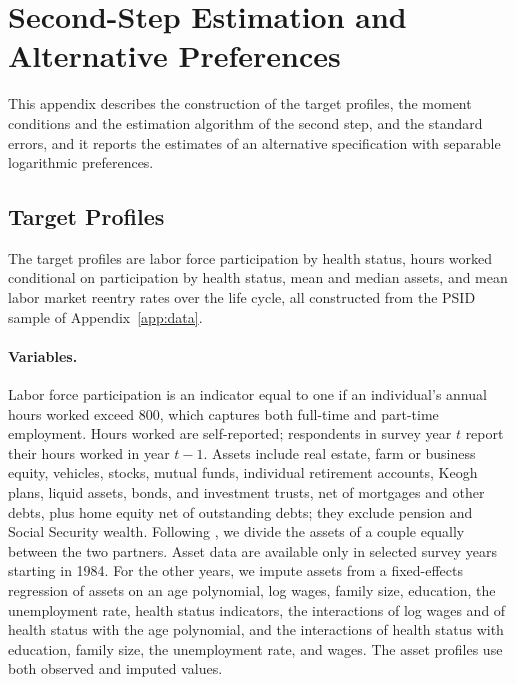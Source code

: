 \section{Second-Step Estimation and Alternative Preferences}\label{app:msm}

This appendix describes the construction of the target profiles, the moment conditions and the estimation algorithm of the second step, and the standard errors, and it reports the estimates of an alternative specification with separable logarithmic preferences.

\subsection{Target Profiles}

The target profiles are labor force participation by health status, hours worked conditional on participation by health status, mean and median assets, and mean labor market reentry rates over the life cycle, all constructed from the PSID sample of Appendix~\ref{app:data}.

\paragraph{Variables.} Labor force participation is an indicator equal to one if an individual's annual hours worked exceed 800, %
which captures both full-time and part-time employment. Hours worked are self-reported; respondents in survey year $t$ report their hours worked in year $t-1$. Assets include real estate, farm or business equity, vehicles, stocks, mutual funds, individual retirement accounts, Keogh plans, liquid assets, bonds, and investment trusts, net of mortgages and other debts, plus home equity net of outstanding debts; they exclude pension and Social Security wealth. Following \citet{Borella2018}, we divide the assets of a couple equally between the two partners. Asset data are available only in selected survey years starting in 1984. %
For the other years, we impute assets from a fixed-effects regression of assets on an age polynomial, log wages, family size, education, the unemployment rate, health status indicators, the interactions of log wages and of health status with the age polynomial, and the interactions of health status with education, family size, the unemployment rate, and wages. The asset profiles use both observed and imputed values.

